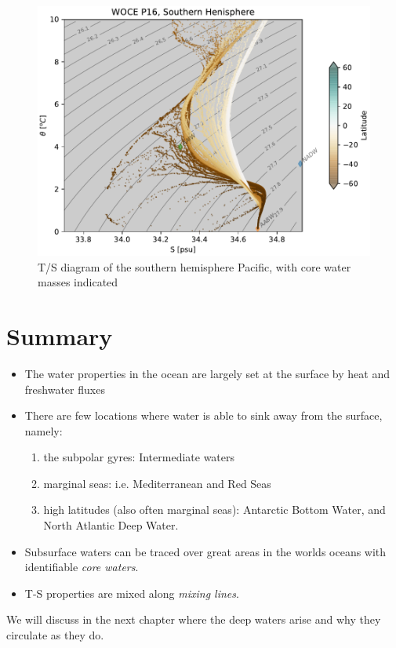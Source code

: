 \begin{figure}[htp]
  \centering
  \includegraphics{figs/WaterMasses/P16TSSouthern}
      \caption{T/S diagram of the southern hemisphere Pacific, with core water masses indicated}
    \label{fig:P16TSSouthern}  
\end{figure}

\section{Summary}

\begin{itemize}
    \item The water properties in the ocean are largely set at the surface by heat and freshwater fluxes
    \item There are few locations where water is able to sink away from the surface, namely:
        \begin{enumerate}
            \item the subpolar gyres: Intermediate waters
            \item marginal seas: i.e. Mediterranean and Red Seas
            \item high latitudes (also often marginal seas): Antarctic Bottom Water, and North Atlantic Deep Water.
        \end{enumerate}
    \item Subsurface waters can be traced over great areas in the worlds oceans with identifiable \emph{core waters}.
    \item T-S properties are mixed along \emph{mixing lines}. 
\end{itemize}

We will discuss in the next chapter where the deep waters arise and why they circulate as they do.  

